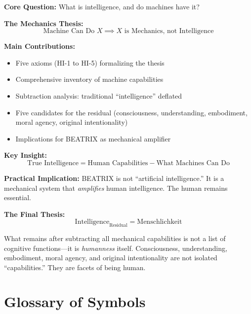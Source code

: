 \begin{tcolorbox}[colback=green!10!white, colframe=green!75!black,
    title=\textbf{Appendix HI: Summary}]

\textbf{Core Question:} What is intelligence, and do machines have it?

\textbf{The Mechanics Thesis:}
\begin{equation}
\text{Machine Can Do } X \implies X \text{ is Mechanics, not Intelligence}
\end{equation}

\textbf{Main Contributions:}
\begin{itemize}[nosep]
    \item Five axioms (HI-1 to HI-5) formalizing the thesis
    \item Comprehensive inventory of machine capabilities
    \item Subtraction analysis: traditional ``intelligence'' deflated
    \item Five candidates for the residual (consciousness, understanding, embodiment, moral agency, original intentionality)
    \item Implications for BEATRIX as mechanical amplifier
\end{itemize}

\textbf{Key Insight:}
\begin{equation}
\text{True Intelligence} = \text{Human Capabilities} - \text{What Machines Can Do}
\end{equation}

\textbf{Practical Implication:} BEATRIX is not ``artificial intelligence.'' It is a mechanical system that \textit{amplifies} human intelligence. The human remains essential.

\vspace{1em}
\textbf{The Final Thesis:}
\begin{equation}
\boxed{\text{Intelligence}_{\text{Residual}} = \text{Menschlichkeit}}
\end{equation}

What remains after subtracting all mechanical capabilities is not a list of cognitive functions---it is \textit{humanness} itself. Consciousness, understanding, embodiment, moral agency, and original intentionality are not isolated ``capabilities.'' They are facets of being human.

\end{tcolorbox}


\section{Glossary of Symbols}
\label{sec:hi-glossary}

